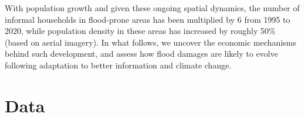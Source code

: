 \documentclass[12pt]{article}
\newcommand\fnote[1]{\captionsetup{justification=raggedright,singlelinecheck=false}\caption*{#1}}
\begin{document}

With population growth and given these ongoing spatial dynamics, the number of informal households in flood-prone areas has been multiplied by 6 from 1995 to 2020, while population density in these areas has increased by roughly 50\% (based on aerial imagery). In what follows, we uncover the economic mechanisms behind such development, and assess how flood damages are likely to evolve following adaptation to better information and climate change. 




\section{Data \label{sec:data}}
\end{document}
